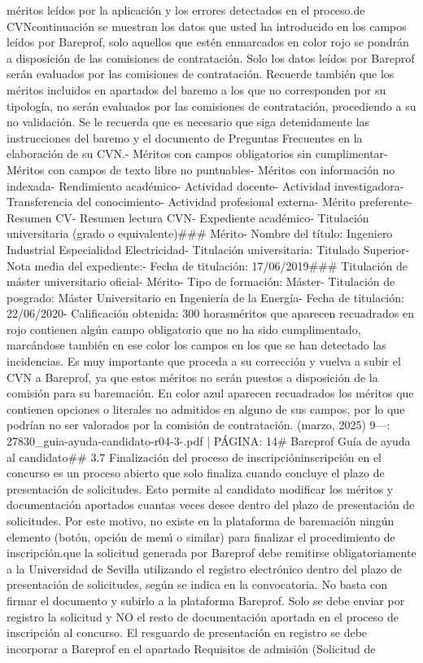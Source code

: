 \documentclass{article}
\begin{document}
\begin{itemize}
méritos leídos por la aplicación y los errores detectados en el proceso.\n\nVisor de CVN\n\nA continuación se muestran los datos que usted ha introducido en los campos leídos por Bareprof, solo aquellos que estén enmarcados en color rojo se pondrán a disposición de las comisiones de contratación. Solo los datos leídos por Bareprof serán evaluados por las comisiones de contratación. Recuerde también que los méritos incluidos en apartados del baremo a los que no corresponden por su tipología, no serán evaluados por las comisiones de contratación, procediendo a su no validación. Se le recuerda que es necesario que siga detenidamente las instrucciones del baremo y el documento de Preguntas Frecuentes en la elaboración de su CVN.\n\n- Méritos con campos obligatorios sin cumplimentar\n- Méritos con campos de texto libre no puntuables\n- Méritos con información no indexada\n\n- Rendimiento académico\n- Actividad docente\n- Actividad investigadora\n- Transferencia del conocimiento\n- Actividad profesional externa\n- Mérito preferente\n- Resumen CV\n- Resumen lectura CVN\n- Expediente académico\n- Titulación universitaria (grado o equivalente)\n\n### Mérito\n\n- Nombre del título: Ingeniero Industrial Especialidad Electricidad\n- Titulación universitaria: Titulado Superior\n- Nota media del expediente:\n- Fecha de titulación: 17/06/2019\n\n### Titulación de máster universitario oficial\n\n- Mérito\n- Tipo de formación: Máster\n- Titulación de posgrado: Máster Universitario en Ingeniería de la Energía\n- Fecha de titulación: 22/06/2020\n- Calificación obtenida: 300 horas\n\nLos méritos que aparecen recuadrados en rojo contienen algún campo obligatorio que no ha sido cumplimentado, marcándose también en ese color los campos en los que se han detectado las incidencias. Es muy importante que proceda a su corrección y vuelva a subir el CVN a Bareprof, ya que estos méritos no serán puestos a disposición de la comisión para su baremación. En color azul aparecen recuadrados los méritos que contienen opciones o literales no admitidos en alguno de sus campos, por lo que podrían no ser valorados por la comisión de contratación.\n{} (marzo, 2025) 9\n\n---\n\nFUENTE: 27830_guia-ayuda-candidato-r04-3-.pdf | PÁGINA: 14\n# Bareprof Guía de ayuda al candidato\n\n## 3.7 Finalización del proceso de inscripción\n\nLa inscripción en el concurso es un proceso abierto que solo finaliza cuando concluye el plazo de presentación de solicitudes. Esto permite al candidato modificar los méritos y documentación aportados cuantas veces desee dentro del plazo de presentación de solicitudes. Por este motivo, no existe en la plataforma de baremación ningún elemento (botón, opción de menú o similar) para finalizar el procedimiento de inscripción.\n\nRecuerde que la solicitud generada por Bareprof debe remitirse obligatoriamente a la Universidad de Sevilla utilizando el registro electrónico dentro del plazo de presentación de solicitudes, según se indica en la convocatoria. No basta con firmar el documento y subirlo a la plataforma Bareprof. Solo se debe enviar por registro la solicitud y NO el resto de documentación aportada en el proceso de inscripción al concurso. El resguardo de presentación en registro se debe incorporar a Bareprof en el apartado Requisitos de admisión (Solicitud de 
\end{itemize}
\end{document}
